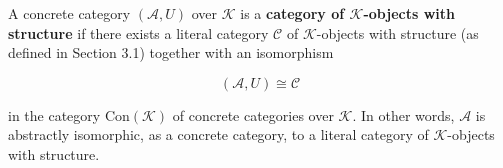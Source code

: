 A concrete category $(\mathcal{A}, U)$ over $\mathcal{K}$ is a \textbf{category of $\mathcal{K}$-objects with structure} if there exists a literal category $\mathcal{C}$ of $\mathcal{K}$-objects with structure (as defined in Section 3.1) together with an isomorphism

$$(\mathcal{A}, U) \cong \mathcal{C}$$

in the category $\text{Con}(\mathcal{K})$ of concrete categories over $\mathcal{K}$. In other words, $\mathcal{A}$ is abstractly isomorphic, as a concrete category, to a literal category of $\mathcal{K}$-objects with structure.
